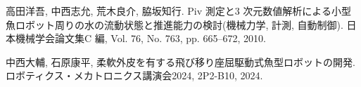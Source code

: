 \documentclass{jarticle}
\begin{document}

% 
% 


\begin{thebibliography}{99}

   高田洋吾, 中西志允, 荒木良介, 脇坂知行. Piv 測定と3 次元数値解析による小型魚ロボット周りの水の流動状態と推進能力の検討(機械力学, 計測, 自動制御). 日本機械学会論文集C 編, Vol. 76, No. 763, pp. 665–672, 2010.

   中西大輔, 石原康平, 柔軟外皮を有する飛び移り座屈駆動式魚型ロボットの開発. ロボティクス・メカトロニクス講演会2024, 2P2-B10, 2024.

\end{thebibliography}
\end{document}
